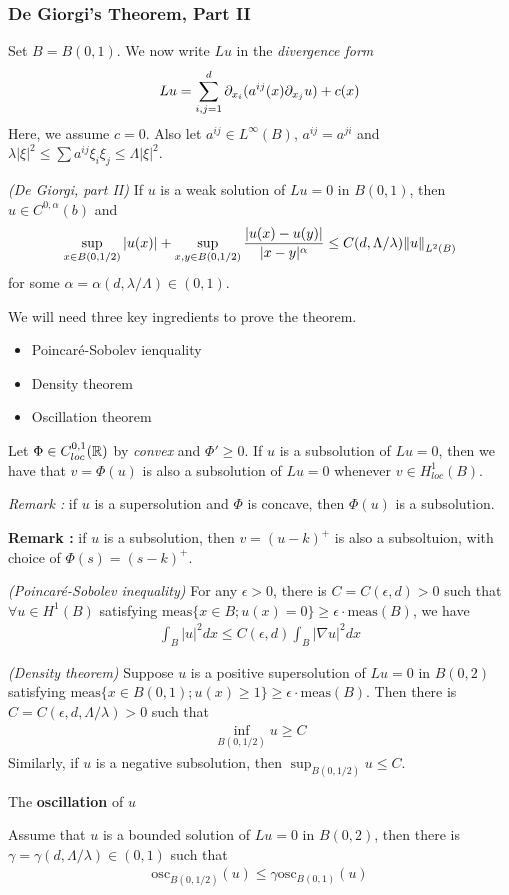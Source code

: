 \documentclass[10pt,a4paper]{article}
\begin{document}
\subsubsection*{De Giorgi's Theorem, Part II}

Set $B= B(0,1)$. We now write $Lu$ in the \emph{divergence form}
\begin{align*}
Lu = \sum_{i,j=1}^d \partial_{x_i}(a^{ij}(x) \partial_{x_j} u) + c(x)
\end{align*}
Here, we assume $c=0$. Also let $a^{ij} \in L^{\infty}(B)$, $a^{ij}= a^{ji}$ and $\lambda |\xi|^2 \leq \sum a^{ij} \xi_i \xi_j \leq \Lambda |\xi|^2$. 
\s

\thm \emph{(De Giorgi, part II)} If $u$ is a weak solution of $Lu=0$ in $B(0, 1)$, then $u\in C^{0, \alpha}(b)$ and
\begin{align*}
\sup_{x\in B(0, 1/2)} |u(x)| + \sup_{x,y\in B(0, 1/2)} \frac{|u(x) - u(y)|}{|x-y|^{\alpha}} \leq C(d, \Lambda/\lambda)\snorms{u}{L^2(B)}
\end{align*}
for some $\alpha = \alpha(d, \lambda/\Lambda) \in (0,1)$.
\s

We will need three key ingredients to prove the theorem.
\begin{itemize}
\item Poincar\'{e}-Sobolev ienquality
\item Density theorem
\item Oscillation theorem
\end{itemize}
\s

\lem Let $\Phi \in C^{0,1}_{loc}(\mathbb{R})$ by \emph{convex} and $\Phi' \geq 0$. If $u$ is a subsolution of $Lu =0$, then we have that $v= \Phi(u)$ is also a subsolution of $Lu =0$ whenever $v\in H_{loc}^1(B)$.
\s

\emph{Remark :} if $u$ is a supersolution and $\Phi$ is concave, then $\Phi(u)$ is a subsolution.
\s

\textbf{Remark :} if $u$ is a subsolution, then $v = (u-k)^+$ is also a subsoltuion, with choice of $\Phi(s) = (s-k)^+$.
\s

\prop \emph{(Poincar\'e-Sobolev inequality)} For any $\epsilon >0$, there is $C = C(\epsilon, d)>0$ such that $\forall u\in H^1(B)$ satisfying $\text{meas}\{x\in B ; u(x) =0 \}\geq \epsilon \cdot \text{meas}(B)$, we have
\begin{align*}
\int_B |u|^2 dx \leq C(\epsilon, d) \int_B |\nabla u|^2 dx 
\end{align*}
\s

\prop \emph{(Density theorem)} Suppose $u$ is a positive supersolution of $Lu =0$ in $B(0, 2)$ satisfying $\text{meas}\{x\in B(0,1) ; u(x) \geq 1 \} \geq \epsilon \cdot \text{meas}(B)$. Then there is $C= C(\epsilon, d, \Lambda/\lambda) >0$ such that
\begin{align*}
\inf_{B(0, 1/2)} u \geq C
\end{align*}
\quad Similarly, if $u$ is a negative subsolution, then $\sup_{B(0, 1/2)} u \leq C$.
\s

 The \textbf{oscillation} of $u$
\s

\prop Assume that $u$ is a bounded solution of $Lu=0$ in $B(0, 2)$, then there is $\gamma = \gamma(d, \Lambda/\lambda) \in (0,1)$ such that
\begin{align*}
\text{osc}_{B(0, 1/2)}(u) \leq \gamma \text{osc}_{B(0,1)}(u)
\end{align*}
\end{document}
